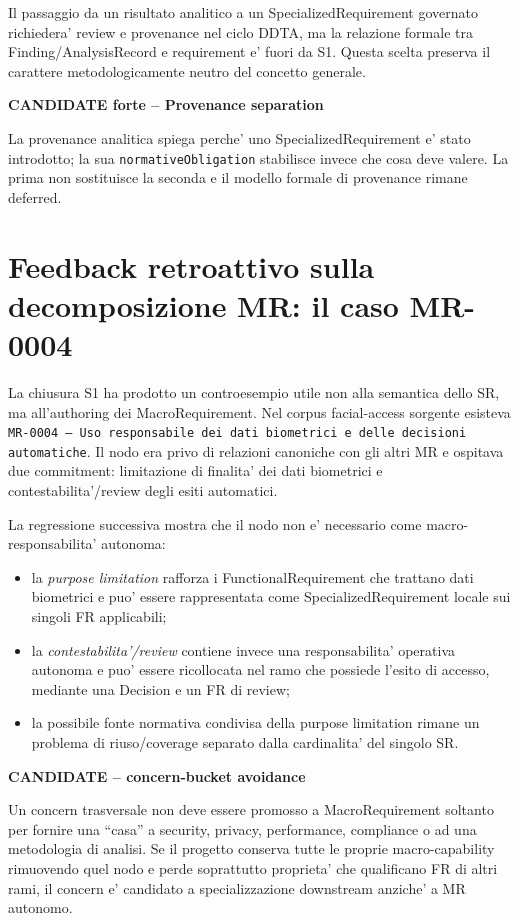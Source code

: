 \documentclass[11pt,a4paper]{article}
\newenvironment{statusbox}[1]{%
  \def\FrameCommand{\fcolorbox{ddtablue}{ddtagray}}%
  \MakeFramed{\advance\hsize-2\width\FrameRestore}
  \noindent\textbf{#1}\par\smallskip
}{\endMakeFramed}
\begin{document}
Il passaggio da un risultato analitico a un SpecializedRequirement governato richiedera' review e provenance nel ciclo DDTA, ma la relazione formale tra Finding/AnalysisRecord e requirement e' fuori da S1. Questa scelta preserva il carattere metodologicamente neutro del concetto generale.

\begin{statusbox}{CANDIDATE forte -- Provenance separation}
La provenance analitica spiega perche' uno SpecializedRequirement e' stato introdotto; la sua \texttt{normativeObligation} stabilisce invece che cosa deve valere. La prima non sostituisce la seconda e il modello formale di provenance rimane deferred.
\end{statusbox}

\section{Feedback retroattivo sulla decomposizione MR: il caso MR-0004}

La chiusura S1 ha prodotto un controesempio utile non alla semantica dello SR, ma all'authoring dei MacroRequirement. Nel corpus facial-access sorgente esisteva \texttt{MR-0004 -- Uso responsabile dei dati biometrici e delle decisioni automatiche}. Il nodo era privo di relazioni canoniche con gli altri MR e ospitava due commitment: limitazione di finalita' dei dati biometrici e contestabilita'/review degli esiti automatici.

La regressione successiva mostra che il nodo non e' necessario come macro-responsabilita' autonoma:

\begin{itemize}
  \item la \emph{purpose limitation} rafforza i FunctionalRequirement che trattano dati biometrici e puo' essere rappresentata come SpecializedRequirement locale sui singoli FR applicabili;
  \item la \emph{contestabilita'/review} contiene invece una responsabilita' operativa autonoma e puo' essere ricollocata nel ramo che possiede l'esito di accesso, mediante una Decision e un FR di review;
  \item la possibile fonte normativa condivisa della purpose limitation rimane un problema di riuso/coverage separato dalla cardinalita' del singolo SR.
\end{itemize}

\begin{statusbox}{CANDIDATE -- concern-bucket avoidance}
Un concern trasversale non deve essere promosso a MacroRequirement soltanto per fornire una ``casa'' a security, privacy, performance, compliance o ad una metodologia di analisi. Se il progetto conserva tutte le proprie macro-capability rimuovendo quel nodo e perde soprattutto proprieta' che qualificano FR di altri rami, il concern e' candidato a specializzazione downstream anziche' a MR autonomo.
\end{statusbox}
\end{document}
